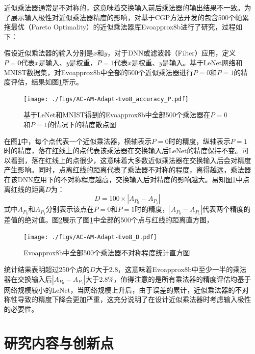近似乘法器通常是不对称的，这意味着交换输入前后乘法器的输出结果不一致。为了展示输入极性对近似乘法器精度的影响，对基于CGP方法开发的包含500个帕累拖最优（Pareto Optimality）的近似乘法器库Evoapprox8b\cite{AC:AM:CGP_Evoapprox8b}进行了研究，过程如下：

假设近似乘法器的输入分别是$x$和$y$，对于DNN或滤波器（Filter）应用，定义$P=0$代表$x$是输入、$y$是权重，$P=1$代表$x$是权重、$y$是输入。基于LeNet网络和MNIST数据集\cite{DNN:LeNet_MNIST}，对Evoapprox8b\cite{AC:AM:CGP_Evoapprox8b}中全部的500个近似乘法器进行$P=0$和$P=1$的精度评估，结果如图\ref{AC:AM:Adapt:Fig:Evo8_accuracy_P}所示。
\begin{figure}[!htb]
    \centering
    \texttt{[image: ./figs/AC-AM-Adapt-Evo8\_accuracy\_P.pdf]}
    \caption{基于LeNet和MNIST得到的Evoapprox8b中全部500个乘法器在$P=0$和$P=1$的情况下的精度散点图}
    \label{AC:AM:Adapt:Fig:Evo8_accuracy_P}
\end{figure}
在图\ref{AC:AM:Adapt:Fig:Evo8_accuracy_P}中，每个点代表一个近似乘法器，横轴表示$P=0$时的精度，纵轴表示$P=1$时的精度，落在红线上的点代表该乘法器在交换输入后LeNet的精度保持不变。可以看到，落在红线上的点很少，这意味着大多数近似乘法器在交换输入后会对精度产生影响。同时，点离红线的距离代表了乘法器不对称的程度，离得越远，乘法器在该DNN应用下的不对称程度越高，交换输入后对精度的影响越大。易知图\ref{AC:AM:Adapt:Fig:Evo8_accuracy_P}中点离红线的距离$D$为：
\begin{equation}
    \label{AC:AM:Adapt:Eq:Evo8_D}
      D =  100 \times | A_{P_0} - A_{P_1} |
\end{equation} 
式中$A_{P_0}$和$A_{P_1}$分别表示该点在$P=0$和$P=1$时的精度，$| A_{P_0} - A_{P_1} |$代表两个精度的差值的绝对值。图\ref{AC:AM:Adapt:Fig:Evo8_D}展示了图\ref{AC:AM:Adapt:Fig:Evo8_accuracy_P}中全部的500个点与红线的距离直方图，
\begin{figure}[!ht]
    \centering
    \texttt{[image: ./figs/AC-AM-Adapt-Evo8\_D.pdf]}
    \caption{Evoapprox8b中全部500个乘法器不对称程度统计直方图}
    \label{AC:AM:Adapt:Fig:Evo8_D}
\end{figure}
统计结果表明超过250个点的$D$大于2.8，这意味着Evoapprox8b\cite{AC:AM:CGP_Evoapprox8b}中至少一半的乘法器在交换输入后$| A_{P_0} - A_{P_1} |$大于2.8\%，值得注意的是所有乘法器的精度评估均基于网络规模较小的LeNet，当网络规模上升后，由于误差的累计，近似乘法器的不对称性导致的精度下降会更加严重，这充分说明了在设计近似乘法器时考虑输入极性的必要性。

\section{研究内容与创新点}

